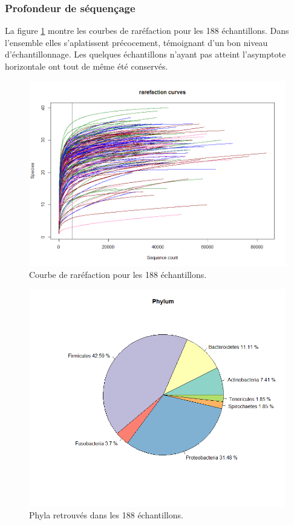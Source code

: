\documentclass[12pt,a4paper]{article}
\begin{document}
\subsubsection{Profondeur de séquençage}
La figure \ref{rarefaction} montre les courbes de raréfaction pour les 188 échantillons.
Dans l'ensemble elles s’aplatissent précocement, témoignant d’un bon niveau d'échantillonnage. Les quelques échantillons n'ayant pas atteint l'asymptote horizontale ont tout de même été conservés.

\begin{figure}[!h]
\begin{center}
\includegraphics[scale=0.5]{img/rarefaction.png}\hfill
\end{center}
\caption{Courbe de raréfaction pour les 188 échantillons. }
\label{rarefaction}
\end{figure}


\begin{figure}[!ht]
\begin{center}
\includegraphics[scale=0.5]{img/phylum.png}\hfill
\end{center}
\caption{Phyla retrouvés dans les 188 échantillons.}
\label{phylum}
\end{figure}
\end{document}
